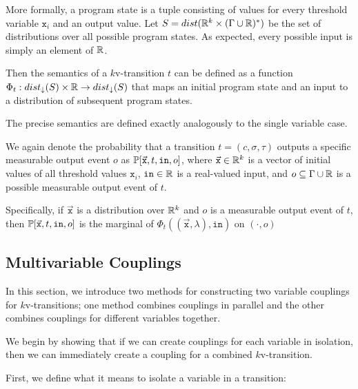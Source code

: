 More formally, a program state is a tuple consisting of values for every threshold variable $\texttt{x}_i$ and an output value. Let $S = dist(\mathbb{R}^k\times (\Gamma\cup \mathbb{R})^*)$ be the set of distributions over all possible program states. As expected, every possible input is simply an element of $\mathbb{R}$. 

Then the semantics of a $k$v-transition $t$ can be defined as a function $\Phi_t: dist_\downarrow(S)\times \mathbb{R}\to dist_\downarrow(S)$ that maps an initial program state and an input to a distribution of subsequent program states.

The precise semantics are defined exactly analogously to the single variable case. 

We again denote the probability that a transition $t=(c, \sigma, \tau)$ outputs a specific measurable output event $o$ as $\mathbb{P}[\vec{\texttt{x}}, t, \texttt{in}, o]$, where $\vec{\texttt{x}}\in \mathbb{R}^k$ is a vector of initial values of all threshold values $\texttt{x}_i$, $\texttt{in}\in \mathbb{R}$ is a real-valued input, and $o\subseteq \Gamma\cup\mathbb{R}$ is a possible measurable output event of $t$.

Specifically, if $\vec{\texttt{x}}$ is a distribution over $\mathbb{R}^k$ and $o$ is a measurable output event of $t$, then $\mathbb{P}[\vec{\texttt{x}}, t, \texttt{in}, o]$ is the marginal of $\Phi_t((\vec{\texttt{x}}, \lambda), \texttt{in})$ on $(\cdot, o)$

\subsection{Multivariable Couplings}

In this section, we introduce two methods for constructing two variable couplings for $k$v-transitions; one method combines couplings in parallel and the other combines couplings for different variables together. 

We begin by showing that if we can create couplings for each variable in isolation, then we can immediately create a coupling for a combined $k$v-transition. 

First, we define what it means to isolate a variable in a transition: 

